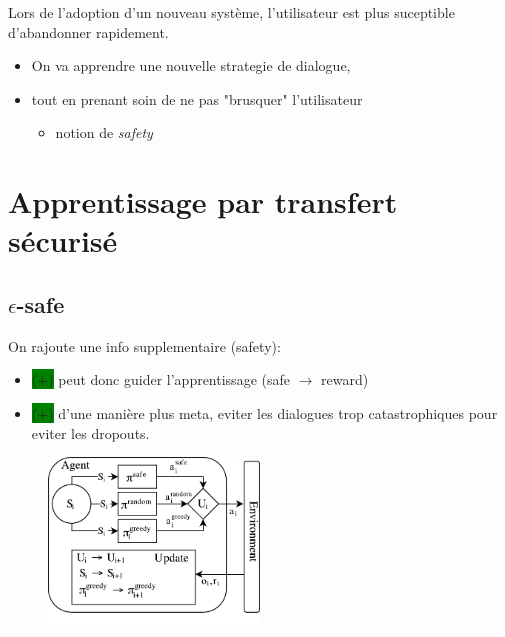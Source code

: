 \documentclass[french,handout]{beamer}
\newcommand{\cplus}{\colorbox{green}{(+)} }
\begin{document}
    \begin{frame}
        Lors de l'adoption d'un nouveau système, l'utilisateur est plus suceptible d'abandonner rapidement.
        \begin{block}{}
            \begin{itemize}
                \item On va apprendre une nouvelle strategie de dialogue,
                \item tout en prenant soin de ne pas "brusquer" l'utilisateur
                \begin{itemize}
                    \item notion de \textit{safety}
                \end{itemize}
            \end{itemize}
        \end{block}

    \end{frame}

    \section{Apprentissage par transfert sécurisé}

    \subsection{$\epsilon$-safe}

    \begin{frame}
        On rajoute une info supplementaire (safety): %
        \begin{itemize}
            \item \cplus peut donc guider l'apprentissage (safe $\rightarrow$ reward)
            \item \cplus d'une manière plus meta, eviter les dialogues trop catastrophiques pour eviter les dropouts.
        \end{itemize}

    \end{frame}

    \begin{frame}

        \begin{figure}
            \begin{center}
                \includegraphics[width=0.5\textwidth]{img/transfer7.pdf}
            \end{center}
        \end{figure}

    \end{frame}
\end{document}

